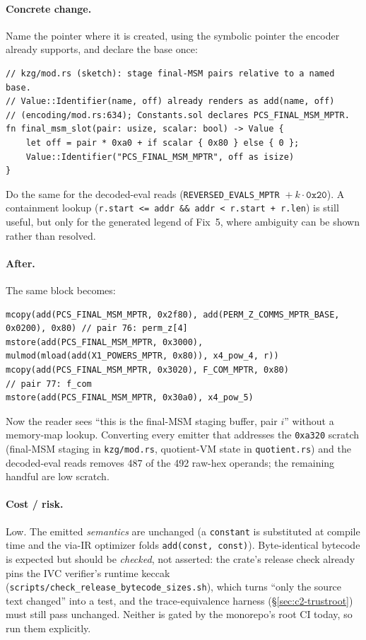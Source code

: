 \paragraph{Concrete change.} Name the pointer where it is created, using the
symbolic pointer the encoder already supports, and declare the base once:

\begin{lstlisting}[style=rust]
// kzg/mod.rs (sketch): stage final-MSM pairs relative to a named base.
// Value::Identifier(name, off) already renders as add(name, off)
// (encoding/mod.rs:634); Constants.sol declares PCS_FINAL_MSM_MPTR.
fn final_msm_slot(pair: usize, scalar: bool) -> Value {
    let off = pair * 0xa0 + if scalar { 0x80 } else { 0 };
    Value::Identifier("PCS_FINAL_MSM_MPTR", off as isize)
}
\end{lstlisting}

Do the same for the decoded-eval reads (\texttt{REVERSED\_\allowbreak{}EVALS\_\allowbreak{}MPTR}
${}+k\cdot\texttt{0x20}$). A containment lookup
(\texttt{r.start <= addr \&\& addr < r.start + r.len}) is still useful, but
only for the generated legend of Fix~5, where ambiguity can be shown rather
than resolved.

\paragraph{After.} The same block becomes:

\begin{lstlisting}[style=yul]
mcopy(add(PCS_FINAL_MSM_MPTR, 0x2f80), add(PERM_Z_COMMS_MPTR_BASE, 0x0200), 0x80) // pair 76: perm_z[4]
mstore(add(PCS_FINAL_MSM_MPTR, 0x3000), mulmod(mload(add(X1_POWERS_MPTR, 0x80)), x4_pow_4, r))
mcopy(add(PCS_FINAL_MSM_MPTR, 0x3020), F_COM_MPTR, 0x80)                          // pair 77: f_com
mstore(add(PCS_FINAL_MSM_MPTR, 0x30a0), x4_pow_5)
\end{lstlisting}

Now the reader sees ``this is the final-MSM staging buffer, pair $i$''
without a memory-map lookup. Converting every emitter that addresses the
\texttt{0xa320} scratch (final-MSM staging in \texttt{kzg/mod.rs},
quotient-VM state in \texttt{quotient.rs}) and the decoded-eval reads removes
487 of the 492 raw-hex operands; the remaining handful are low scratch.

\paragraph{Cost / risk.} Low. The emitted \emph{semantics} are unchanged
(a \texttt{constant} is substituted at compile time and the via-IR optimizer
folds \texttt{add(const, const)}). Byte-identical bytecode is expected but
should be \emph{checked}, not asserted: the crate's release check already
pins the IVC verifier's runtime keccak
(\texttt{scripts/\allowbreak{}check\_\allowbreak{}release\_\allowbreak{}bytecode\_\allowbreak{}sizes.sh}), which turns ``only
the source text changed'' into a test, and the trace-equivalence harness
(\S\ref{sec:c2-trustroot}) must still pass unchanged. Neither is gated by
the monorepo's root CI today, so run them explicitly.

